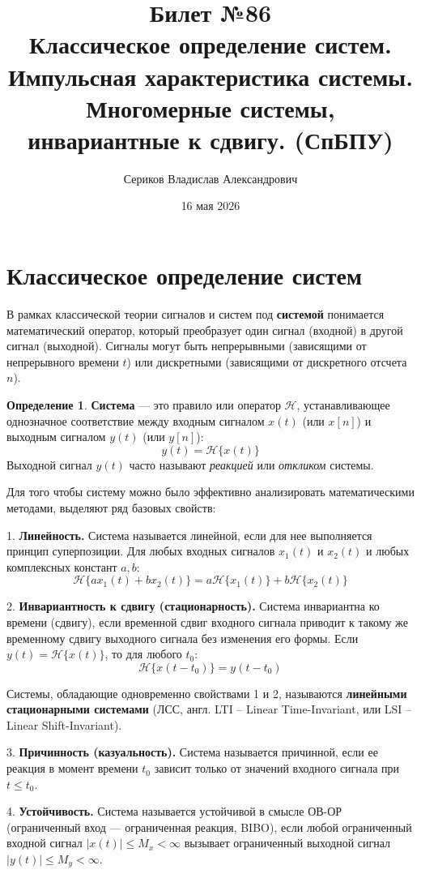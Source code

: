 \documentclass[a4paper, 12pt]{article}
\title{Билет №86 \\ \small Классическое определение систем. Импульсная характеристика системы. Многомерные системы, инвариантные к сдвигу. (СпБПУ)}
\author{Сериков Владислав Александрович}
\date{16 мая 2026}
\theoremstyle{definition}
\newtheorem{definition}{Определение}
\theoremstyle{plain}
\begin{document}
\maketitle
\tableofcontents
\newpage

\section{Классическое определение систем}

В рамках классической теории сигналов и систем под \textbf{системой} понимается математический оператор, который преобразует один сигнал (входной) в другой сигнал (выходной). Сигналы могут быть непрерывными (зависящими от непрерывного времени $t$) или дискретными (зависящими от дискретного отсчета $n$).

\begin{definition}
\textbf{Система} — это правило или оператор $\mathcal{H}$, устанавливающее однозначное соответствие между входным сигналом $x(t)$ (или $x[n]$) и выходным сигналом $y(t)$ (или $y[n]$):
$$y(t) = \mathcal{H}\{x(t)\}$$
Выходной сигнал $y(t)$ часто называют \textit{реакцией} или \textit{откликом} системы.
\end{definition}

Для того чтобы систему можно было эффективно анализировать математическими методами, выделяют ряд базовых свойств:

1. \textbf{Линейность.} Система называется линейной, если для нее выполняется принцип суперпозиции. Для любых входных сигналов $x_1(t)$ и $x_2(t)$ и любых комплексных констант $a, b$:
$$ \mathcal{H}\{a x_1(t) + b x_2(t)\} = a \mathcal{H}\{x_1(t)\} + b \mathcal{H}\{x_2(t)\} $$

2. \textbf{Инвариантность к сдвигу (стационарность).} Система инвариантна ко времени (сдвигу), если временной сдвиг входного сигнала приводит к такому же временному сдвигу выходного сигнала без изменения его формы. Если $y(t) = \mathcal{H}\{x(t)\}$, то для любого $t_0$:
$$ \mathcal{H}\{x(t - t_0)\} = y(t - t_0) $$

Системы, обладающие одновременно свойствами 1 и 2, называются \textbf{линейными стационарными системами} (ЛСС, англ. LTI -- Linear Time-Invariant, или LSI -- Linear Shift-Invariant).

3. \textbf{Причинность (казуальность).} Система называется причинной, если ее реакция в момент времени $t_0$ зависит только от значений входного сигнала при $t \le t_0$.

4. \textbf{Устойчивость.} Система называется устойчивой в смысле ОВ-ОР (ограниченный вход — ограниченная реакция, BIBO), если любой ограниченный входной сигнал $|x(t)| \le M_x < \infty$ вызывает ограниченный выходной сигнал $|y(t)| \le M_y < \infty$.
\end{document}
